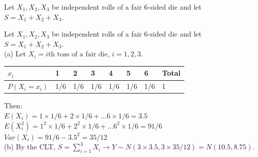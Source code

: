 \documentclass[bigtut]{tutorial}\usepackage[]{graphicx}\usepackage[]{color}
\begin{document}
\begin{tutorial}
\begin{questions}
Let $X_1,X_2,X_3$ be independent rolls of a fair 6-sided die and let
$S=X_1+X_2+X_3$. \\

                                    

\begin{solution}
Let $X_1,X_2,X_3$ be independent rolls of a fair 6-sided die and let
$S=X_1+X_2+X_3$. \\

(a)
Let $X_{i} = i\text{th toss of a fair die}$, $i=1,2,3$. \\

\begin{tabular}{|l |l |l |l |l |l |l |l  |} \hline
$x_{i}$ & 1   & 2  & 3  & 4 & 5 & 6 &  Total \\ \hline
$P(X_{i} = x_{i})$ & 1/6 &1/6 &1/6 &1/6 &1/6 &1/6 & 1 \\ \hline
\end{tabular}

\vspace{.5cm}
Then: \\
$E(X_i)= 1 \times 1/6 + 2 \times 1/6 + \ldots 6 \times 1/6 = 3.5$ \\
$E(X_i^2)= 1^2 \times 1/6 + 2^2 \times 1/6 + \ldots 6^2 \times 1/6 = 91/6$ \\
$Var(X_i)=91/6 - 3.5^2 = 35/12$ \\

(b)
By the CLT,  $S = \sum_{i=1}^{3} X_{i} \rightarrow Y \sim N( 3 \times 3.5, 3 \times 35/12) = N( 10.5, 8.75)$. \\


\end{solution}
\end{questions}
\end{tutorial}
\end{document}
